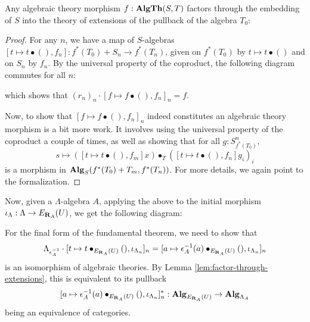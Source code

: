 \begin{lemma}\label{lem:factor-through-extensions}
  Any algebraic theory morphism $ f: \mathbf{AlgTh}(S, T) $ factors through the embedding of $ S $ into the theory of extensions of the pullback of the algebra $ T_0 $:
  \begin{center}
  \end{center}
\end{lemma}
\begin{proof}
  For any $ n $, we have a map of $ S $-algebras $ [t \mapsto t \bullet (), f_n] : f^*(T_0) + S_n \to f^*(T_n) $, given on $ f^*(T_0) $ by $ t \mapsto t \bullet () $ and on $ S_n $ by $ f_n $. By the universal property of the coproduct, the following diagram commutes for all $ n $:
  \begin{center}
  \end{center}
  which shows that $ (r_n)_n \cdot [f \mapsto f \bullet (), f_n]_n = f $.

  Now, to show that $ [f \mapsto f \bullet (), f_n]_n $ indeed constitutes an algebraic theory morphism is a bit more work. It involves using the universal property of the coproduct a couple of times, as well as showing that for all $ g : S_{f^*(T_0)}^n $,
  \[ s \mapsto ([t \mapsto t \bullet (), f_m] x) \bullet_T ([t \mapsto t \bullet (), f_n] g_i)_i \]
  is a morphism in $ \mathbf{Alg}_{S}(f^*(T_0) + T_m, f^*(T_n)) $. For more details, we again point to the formalization.
\end{proof}

Now, given a $ \Lambda $-algebra $ A $, applying the above to the initial morphism $ \iota_\Lambda : \Lambda \to E_{\mathbf{R}_A}(U) $, we get the following diagram:
\begin{center}
\end{center}
For the final form of the fundamental theorem, we need to show that
\[ \Lambda_{\epsilon_A^{-1}} \cdot [t \mapsto t \bullet_{E_{\mathbf{R}_A}(U)} (), \iota_{\Lambda_n}]_n = [a \mapsto \epsilon_A^{-1}(a) \bullet_{E_{\mathbf{R}_A}(U)} (), \iota_{\Lambda_n}]_n \]
is an isomorphism of algebraic theories. By Lemma \ref{lem:factor-through-extensions}, this is equivalent to its pullback
\[ [a \mapsto \epsilon_A^{-1}(a) \bullet_{E_{\mathbf{R}_A}(U)} (), \iota_{\Lambda_n}]_n^* : \mathbf{Alg}_{E_{\mathbf{R}_A}(U)} \to \mathbf{Alg}_{\Lambda_A} \]
being an equivalence of categories.

